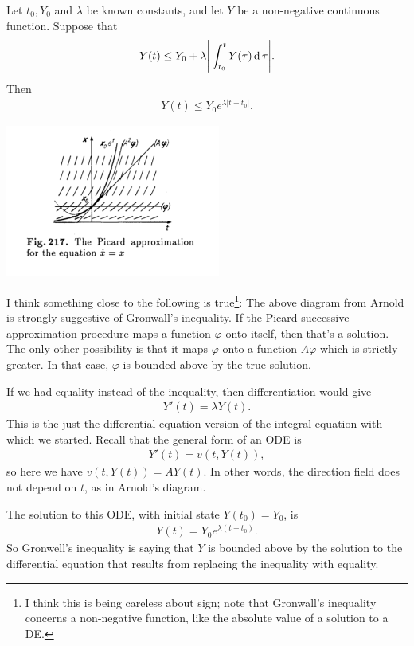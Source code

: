 \begin{theorem*}
  Let $t_0, Y_0$ and $\lambda$ be known constants, and let $Y$ be a non-negative
  continuous function. Suppose that
  \begin{align*}
    Y(t) \leq Y_0 + \lambda\Bigg|\int_{t_0}^t Y(\tau) \operatorname{\text{d}}\tau\Bigg|.
  \end{align*}
  Then
  \begin{align*}
    Y(t) \leq Y_0e^{\lambda|t - t_0|}.
  \end{align*}
\end{theorem*}

\begin{mdframed}
\includegraphics[width=200pt]{img/differential-equations-picard-gronwall.png}
\end{mdframed}

\begin{remark*}
  I think something close to the following is true\footnote{I think this is
    being careless about sign; note that Gronwall's inequality concerns a
    non-negative function, like the absolute value of a solution to a DE.}: The
  above diagram from Arnold is strongly suggestive of Gronwall's inequality. If
  the Picard successive approximation procedure maps a function $\varphi$ onto
  itself, then that's a solution. The only other possibility is that it maps
  $\varphi$ onto a function $A\varphi$ which is strictly greater. In that case,
  $\varphi$ is bounded above by the true solution.
\end{remark*}

\begin{remark*}
  If we had equality instead of the inequality, then differentiation would give
  \begin{align*}
    Y'(t) = \lambda Y(t).
  \end{align*}
  This is the just the differential equation version of the integral equation
  with which we started. Recall that the general form of an ODE is
  \begin{align*}
    Y'(t) = v(t, Y(t)),
  \end{align*}
  so here we have $v(t, Y(t)) = AY(t)$. In other words, the direction field
  does not depend on $t$, as in Arnold's diagram.

  The solution to this ODE, with initial state $Y(t_0) = Y_0$, is
  \begin{align*}
    Y(t) = Y_0e^{\lambda(t - t_0)}.
  \end{align*}
  So Gronwell's inequality is saying that $Y$ is bounded above by the solution
  to the differential equation that results from replacing the inequality with
  equality.
\end{remark*}

